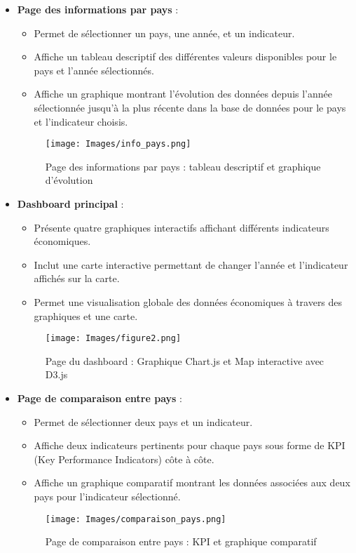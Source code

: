 \documentclass[11pt]{article}
\begin{document}
\begin{itemize}
  \item \textbf{Page des informations par pays} :
    \begin{itemize}
      \item Permet de sélectionner un pays, une année, et un indicateur.
      \item Affiche un tableau descriptif des différentes valeurs disponibles pour le pays et l'année sélectionnés.
      \item Affiche un graphique montrant l'évolution des données depuis l'année sélectionnée jusqu'à la plus récente dans la base de données pour le pays et l'indicateur choisis.
    \end{itemize}
\vspace{1cm}
    \begin{figure}[H]
        \centering
        \texttt{[image: Images/info\_pays.png]}
        \caption{Page des informations par pays : tableau descriptif et graphique d'évolution}
        \label{fig:info_pays}
    \end{figure}

\newpage
  \item \textbf{Dashboard principal} :
    \begin{itemize}
      \item Présente quatre graphiques interactifs affichant différents indicateurs économiques.
      \item Inclut une carte interactive permettant de changer l'année et l'indicateur affichés sur la carte.
      \item Permet une visualisation globale des données économiques à travers des graphiques et une carte.
    \end{itemize}
\vspace{1cm}
    \begin{figure}[H]
        \centering
        \texttt{[image: Images/figure2.png]}
        \caption{Page du dashboard : Graphique Chart.js et Map interactive avec D3.js}
        \label{fig:dashboard}
    \end{figure}
    
\newpage

  \item \textbf{Page de comparaison entre pays} :
    \begin{itemize}
      \item Permet de sélectionner deux pays et un indicateur.
      \item Affiche deux indicateurs pertinents pour chaque pays sous forme de KPI (Key Performance Indicators) côte à côte.
      \item Affiche un graphique comparatif montrant les données associées aux deux pays pour l'indicateur sélectionné.
    \end{itemize}
\vspace{1cm}
    \begin{figure}[H]
        \centering
        \texttt{[image: Images/comparaison\_pays.png]}
        \caption{Page de comparaison entre pays : KPI et graphique comparatif}
        \label{fig:comparaison_pays}
    \end{figure}
\end{itemize}
\end{document}
